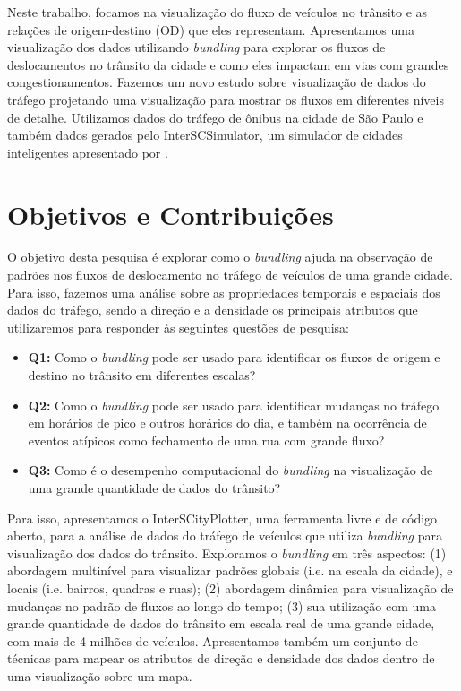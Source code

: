   Neste trabalho, focamos na visualização do fluxo de veículos no trânsito e as
relações de origem-destino (OD) que eles representam. Apresentamos uma
visualização dos dados utilizando \emph{bundling} para explorar os fluxos de
deslocamentos no trânsito da cidade e como eles impactam em vias com grandes
congestionamentos. Fazemos um novo estudo sobre visualização de dados do
tráfego projetando uma visualização para mostrar os fluxos em diferentes níveis
de detalhe. Utilizamos dados do tráfego de ônibus na cidade de São Paulo e
também dados gerados pelo InterSCSimulator, um simulador de cidades
inteligentes apresentado por \citet{mabs2017}.

\section{Objetivos e Contribuições}
  O objetivo desta pesquisa é explorar como o \emph{bundling} ajuda na
observação de padrões nos fluxos de deslocamento no tráfego de veículos de uma
grande cidade. Para isso, fazemos uma análise sobre as propriedades temporais e
espaciais dos dados do tráfego, sendo a direção e a densidade os principais
atributos que utilizaremos para responder às seguintes questões de pesquisa:

\begin{itemize}
  \item \textbf{Q1:} Como o \emph{bundling} pode ser usado para identificar os
fluxos de origem e destino no trânsito em diferentes escalas?

  \item \textbf{Q2:} Como o \emph{bundling} pode ser usado para identificar
mudanças no tráfego em horários de pico e outros horários do dia, e também na
ocorrência de eventos atípicos como fechamento de uma rua com grande fluxo?

  \item \textbf{Q3:} Como é o desempenho computacional do \emph{bundling} na
visualização de uma grande quantidade de dados do trânsito?
\end{itemize}

 Para isso, apresentamos o InterSCityPlotter, uma ferramenta livre e de código
aberto, para a análise de dados do tráfego de veículos que utiliza
\emph{bundling} para visualização dos dados do trânsito.  Exploramos o
\emph{bundling} em três aspectos: (1) abordagem multinível para visualizar
padrões globais (i.e. na escala da cidade), e locais (i.e. bairros, quadras e
ruas); (2) abordagem dinâmica para visualização de mudanças no padrão de fluxos
ao longo do tempo; (3) sua utilização com uma grande quantidade de dados do
trânsito em escala real de uma grande cidade, com mais de 4 milhões de
veículos.  Apresentamos também um conjunto de técnicas para mapear os atributos
de direção e densidade dos dados dentro de uma visualização sobre um mapa.

